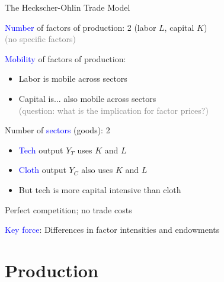 \documentclass[notes,11pt, aspectratio=169, xcolor=table]{beamer}
\newcommand{\blue}[1]{\textcolor{blue}{#1}}
\newenvironment{wideitemize}{\itemize\addtolength{\itemsep}{10pt}}{\enditemize}
\begin{document}
\begin{frame}{The Heckscher-Ohlin Trade Model}
    \begin{wideitemize}
        \item \blue{Number} of factors of production: 2 (labor $L$, capital $K$)\\
        \qquad \textcolor{gray}{(no specific factors)}
        
    \item<2-> \blue{Mobility} of factors of production:
    \begin{itemize}
        \item Labor is mobile across sectors 
        \item Capital is... also mobile across sectors \\
        \qquad \textcolor{gray}{(question: what is the implication for factor prices?)}
    \end{itemize}

    \item<3-> Number of \blue{sectors} (goods): 2 
    \begin{itemize}
        \item \blue{Tech} output $Y_T$ uses $K$ and $L$
        \item \blue{Cloth} output $Y_C$ also uses $K$ and $L$
        \item But tech is more capital intensive than cloth \\
    \end{itemize}

    \item<4-> Perfect competition; no trade costs

    \item<5-> \blue{Key force}: Differences in factor intensities and endowments
    \end{wideitemize}    
\end{frame}

\section{Production}
\end{document}
